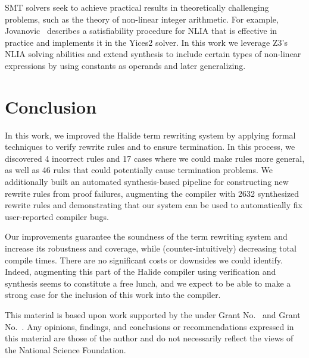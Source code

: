 \documentclass[sigplan,10pt,review,anonymous]{acmart}\settopmatter{printfolios=true,printccs=false,printacmref=false}
\newcommand{\NumRulesFixed}{{\color{black} 4}\xspace}
\newcommand{\NumPredicatesRelaxed}{{\color{black} 17}\xspace}
\newcommand{\NumOrderingProblems}{{\color{black} 46}\xspace}
\newcommand{\NumRulesSynthesized}{{\color{black} 2632}\xspace}
\begin{document}
SMT solvers seek to achieve practical results in theoretically challenging problems, such as the theory of non-linear integer arithmetic. For example, Jovanovic~\cite{jovanovic2017solving} describes a satisfiability procedure for NLIA that is effective in practice and implements it in the Yices2 solver. In this work we leverage Z3's NLIA solving abilities and extend synthesis to include certain types of non-linear expressions by using constants as operands and later generalizing.

\section{Conclusion}
In this work, we improved the Halide term rewriting system by applying formal
techniques to verify rewrite rules and to ensure termination.  In this process,
we discovered \NumRulesFixed incorrect rules and \NumPredicatesRelaxed cases
where we could make rules more general, as well as \NumOrderingProblems rules
that could potentially cause termination problems.  We additionally built
an automated synthesis-based pipeline for constructing new rewrite rules from
proof failures, augmenting the compiler with \NumRulesSynthesized synthesized
rewrite rules and demonstrating that our system can be used to automatically fix
user-reported compiler bugs.

Our improvements guarantee the soundness of the term rewriting system
and increase its robustness and coverage, while (counter-intuitively)
decreasing total compile times. There are no significant costs or
downsides we could identify. Indeed, augmenting this part of the
Halide compiler using verification and synthesis seems to constitute a
free lunch, and we expect to be able to make a strong case for the
inclusion of this work into the compiler.


\begin{acks}                            %
  This material is based upon work supported by the
   under Grant
  No.~ and Grant
  No.~.  Any opinions, findings, and
  conclusions or recommendations expressed in this material are those
  of the author and do not necessarily reflect the views of the
  National Science Foundation.
\end{acks}
\end{document}
